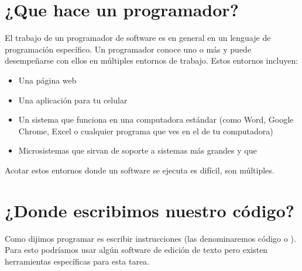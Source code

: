 \documentclass[a4paper,12pt,spanish]{sphinxmanual}
\begin{document}
\sphinxstepscope


\chapter{¿Que hace un programador?}
\label{\detokenize{hace:que-hace-un-programador}}\label{\detokenize{hace::doc}}
\sphinxAtStartPar
El trabajo de un programador de software es en general
 en un lenguaje de programación específico.
Un programador conoce uno o más  y puede desempeñarse con ellos en
múltiples entornos de trabajo.
Estos entornos incluyen:
\begin{itemize}
\item {} 
\sphinxAtStartPar
Una página web

\item {} 
\sphinxAtStartPar
Una aplicación para tu celular

\item {} 
\sphinxAtStartPar
Un sistema que funciona en una computadora estándar (como Word, Google Chrome, Excel o
cualquier programa que ves en el  de tu computadora)

\item {} 
\sphinxAtStartPar
Micro\sphinxhyphen{}sistemas que sirvan de soporte a sistemas más grandes y que 

\end{itemize}

\sphinxAtStartPar
Acotar estos entornos donde un software se ejecuta es difícil, son múltiples.

\noindent{}

\sphinxstepscope


\chapter{¿Donde escribimos nuestro código?}
\label{\detokenize{donde:donde-escribimos-nuestro-codigo}}\label{\detokenize{donde::doc}}
\sphinxAtStartPar
Como dijimos programar es escribir instrucciones (las denominaremos código o ). Para esto podríamos usar algún
software de edición de texto pero existen herramientas específicas para esta tarea.

\sphinxAtStartPar
{}

\noindent{}
\end{document}
